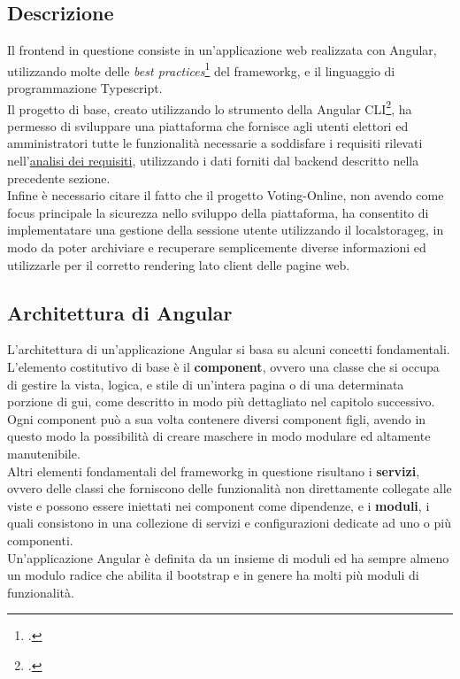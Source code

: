 \subsection{Descrizione}
Il \gls{frontend} in questione consiste in un'applicazione web realizzata con Angular, utilizzando molte delle \textit{best practices}\footcite{angular-best-practices} del \gls{frameworkg}, e il linguaggio di programmazione Typescript. \\
Il progetto di base, creato utilizzando lo strumento  della Angular CLI\footcite{angular-cli}, ha permesso di sviluppare una piattaforma che fornisce agli utenti elettori ed amministratori tutte le funzionalità necessarie a soddisfare i requisiti rilevati nell'\hyperref[cap:analisi-requisiti]{analisi dei requisiti}, utilizzando i dati forniti dal \gls{backend} descritto nella precedente sezione. \\
Infine è necessario citare il fatto che il progetto Voting-Online, non avendo come focus principale la sicurezza nello sviluppo della piattaforma, ha consentito di implementatare una gestione della sessione utente utilizzando il \gls{localstorageg}, in modo da poter archiviare e recuperare semplicemente diverse informazioni ed utilizzarle per il corretto rendering lato client delle pagine web.

\subsection{Architettura di Angular}
L'architettura di un'applicazione Angular si basa su alcuni concetti fondamentali. L'elemento costitutivo di base è il \textbf{component}, ovvero una classe che si occupa di gestire la vista, logica, e stile di un'intera pagina o di una determinata porzione di \gls{gui}, come descritto in modo più dettagliato nel capitolo successivo. Ogni component può a sua volta contenere diversi component figli, avendo in questo modo la possibilità di creare maschere in modo modulare ed altamente manutenibile. \\
Altri elementi fondamentali del \gls{frameworkg} in questione risultano i \textbf{servizi}, ovvero delle classi che forniscono delle funzionalità non direttamente collegate alle viste e possono essere iniettati nei component come dipendenze, e i \textbf{moduli}, i quali consistono in una collezione di servizi e configurazioni dedicate ad uno o più componenti. \\
Un'applicazione Angular è definita da un insieme di moduli ed ha sempre almeno un modulo radice che abilita il bootstrap e in genere ha molti più moduli di funzionalità.

